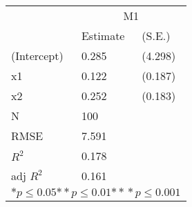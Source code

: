 \begin{tabular}{*{3}{l}}
\hline
                  & \multicolumn{2}{c}{M1}   \tabularnewline
                   &Estimate  &(S.E.)  \tabularnewline
 \hline
 \hline
   (Intercept)     &0.285   &   (4.298) \tabularnewline
   x1              &0.122   &   (0.187) \tabularnewline
   x2              &0.252   &   (0.183) \tabularnewline
 \hline
 N                 &100       &        \tabularnewline
 RMSE             &7.591         & \tabularnewline
 $R^2$             &0.178         & \tabularnewline
 adj $R^2$         &0.161         & \tabularnewline
 \hline
\hline
 
 \multicolumn{3}{c}{${*  p}\le 0.05$${*\!\!*  p}\le 0.01$${*\!\!*\!\!*  p}\le 0.001$}\tabularnewline
 \end{tabular}